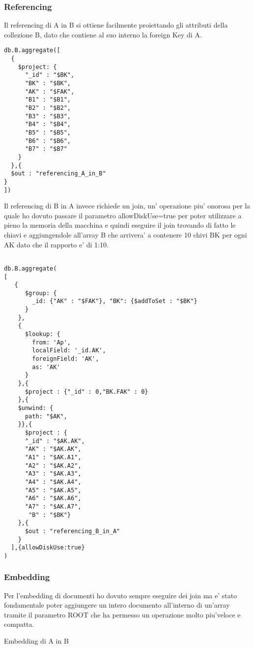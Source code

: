 \subsubsection{Referencing}

Il referencing di A in B si ottiene facilmente proiettando gli attributi della collezione B, dato che contiene al suo interno la foreign Key di A.

\begin{verbatim}
db.B.aggregate([
  {
    $project: {
      "_id" : "$BK",
      "BK" : "$BK",
      "AK" : "$FAK",
      "B1" : "$B1",   
      "B2" : "$B2",
      "B3" : "$B3",
      "B4" : "$B4",
      "B5" : "$B5",
      "B6" : "$B6",
      "B7" : "$B7"
    }
  },{
  $out : "referencing_A_in_B"
}
])
\end{verbatim}

Il referencing di B in A invece richiede un join, un' operazione piu' onorosa per la quale ho dovuto passare il parametro allowDiskUse=true per poter utilizzare
a pieno la memoria della macchina e quindi eseguire il join trovando di fatto le chiavi e aggiungendole all'array B che arrivera' a contenere 10 chivi BK per ogni 
AK dato che il rapporto e' di 1:10. 

\begin{verbatim}
    
db.B.aggregate(
[
   {
      $group: {
        _id: {"AK" : "$FAK"}, "BK": {$addToSet : "$BK"}
      }
    },
    {
      $lookup: {
        from: 'Ap',
        localField: '_id.AK',
        foreignField: 'AK',
        as: 'AK'
      }
    },{
      $project : {"_id" : 0,"BK.FAK" : 0}
    },{
    $unwind: {
      path: "$AK",
    }},{
      $project : {
      "_id" : "$AK.AK",
      "AK" : "$AK.AK",
      "A1" : "$AK.A1", 
      "A2" : "$AK.A2", 
      "A3" : "$AK.A3", 
      "A4" : "$AK.A4",
      "A5" : "$AK.A5",
      "A6" : "$AK.A6",
      "A7" : "$AK.A7",
       "B" : "$BK"} 
    },{
      $out : "referencing_B_in_A"
    }
  ],{allowDiskUse:true}
)
\end{verbatim}

\subsubsection{Embedding}
Per l'embedding di documenti ho dovuto sempre eseguire dei join ma e' stato fondamentale poter aggiungere un intero documento all'interno di un'array tramite il parametro
$$ROOT che ha permesso un operazione molto piu'veloce e compatta.

Embedding di A in B 

